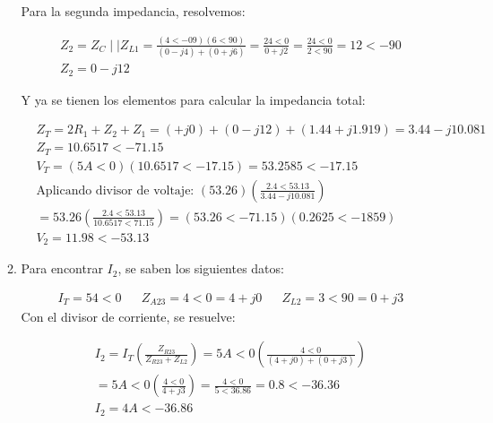 \begin{enumerate}
\begin{enumerate}
		            Para la segunda impedancia, resolvemos:

		            \begin{align*}
			             & Z_2=Z_C\mid\mid Z_{L1}=\frac{(4<-09)(6<90)}{(0-j4)+(0+j6)}=\frac{24<0}{0+j2}=\frac{24<0}{2<90}=12<-90 \\
			             & Z_2=0-j12
		            \end{align*}

		            Y ya se tienen los elementos para calcular la impedancia total:

		            \begin{align*}
			             & Z_T=2R_1+Z_2+Z_1=(+j0)+(0-j12)+(1.44+j1.919)=3.44-j10.081                               \\
			             & Z_T=10.6517<-71.15                                                                      \\
			             & V_T=(5A<0)(10.6517<-17.15)=53.2585<-17.15                                               \\
			             & \text{Aplicando divisor de voltaje: }(53.26)\left(\frac{2.4<53.13}{3.44-j10.081}\right) \\
			             & =53.26\left(\frac{2.4<53.13}{10.6517<71.15}\right)=(53.26<-71.15)(0.2625<-1859)         \\
			             & V_2=11.98<-53.13
		            \end{align*}

		      \item Para encontrar $I_2$, se saben los siguientes datos:

		            \begin{align*}
			             & I_T=54<0 &  & Z_{A23}=4<0=4+j0 &  & Z_{L2}=3<90=0+j3
		            \end{align*}
		            Con el divisor de corriente, se resuelve:

		            \begin{align*}
			             & I_2=I_T\left(\frac{Z_{R23}}{Z_{R23}+Z_{L2}}\right)=5A<0\left(\frac{4<0}{(4+j0)+(0+j3)}\right) \\
			             & =5A<0\left(\frac{4<0}{4+j3}\right)=\frac{4<0}{5<36.86}=0.8<-36.36                             \\
			             & I_2=4A<-36.86
		            \end{align*}
	      \end{enumerate}



\end{enumerate}
